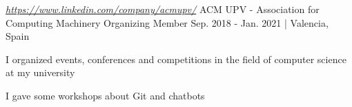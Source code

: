 \begin{cventries}
  \cventry
    {\href{https://www.linkedin.com/company/acmupv/}{\textit{https://www.linkedin.com/company/acmupv/}}} %
    {ACM UPV - Association for Computing Machinery} %
    {Organizing Member} %
    {Sep. 2018 - Jan. 2021 | Valencia, Spain} %
    {
      \begin{cvitems} %
        \item {I organized events, conferences and competitions in the field of computer science at my university}
        \item {I gave some workshops about Git and chatbots}
      \end{cvitems}
    }

\end{cventries}
